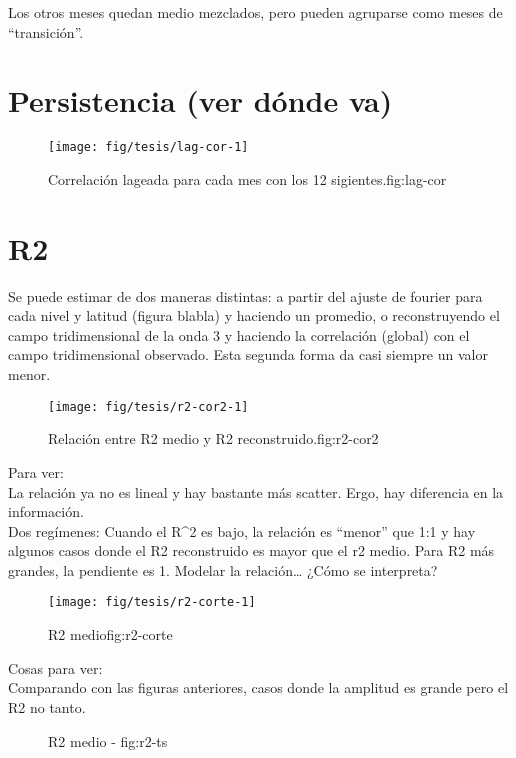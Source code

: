\documentclass[spanish,a4paper]{book}
\begin{document}
Los otros meses quedan medio mezclados, pero pueden agruparse como meses
de ``transición''.

\section{Persistencia (ver dónde va)}\label{persistencia-ver-donde-va}

\begin{figure}
\texttt{[image: fig/tesis/lag-cor-1]} \caption{Correlación lageada para cada mes con los 12 sigientes.{fig:lag-cor}}\label{fig:lag-cor}
\end{figure}

\section{R2}\label{r2}

Se puede estimar de dos maneras distintas: a partir del ajuste de
fourier para cada nivel y latitud (figura blabla) y haciendo un
promedio, o reconstruyendo el campo tridimensional de la onda 3 y
haciendo la correlación (global) con el campo tridimensional observado.
Esta segunda forma da casi siempre un valor menor.

\begin{figure}
\texttt{[image: fig/tesis/r2-cor2-1]} \caption{Relación entre R2 medio y R2 reconstruido.{fig:r2-cor2}}\label{fig:r2-cor2}
\end{figure}

Para ver:\\
La relación ya no es lineal y hay bastante más scatter. Ergo, hay
diferencia en la información.\\
Dos regímenes: Cuando el R\^{}2 es bajo, la relación es ``menor'' que
1:1 y hay algunos casos donde el R2 reconstruido es mayor que el r2
medio. Para R2 más grandes, la pendiente es 1. Modelar la
relación\ldots{} ¿Cómo se interpreta?

\begin{figure*}
\texttt{[image: fig/tesis/r2-corte-1]} \caption{R2 medio{fig:r2-corte}}\label{fig:r2-corte}
\end{figure*}

Cosas para ver:\\
Comparando con las figuras anteriores, casos donde la amplitud es grande
pero el R2 no tanto.

\begin{figure*}
\newline{}\caption{R2 medio - fig:r2-ts}\label{fig:r2-ts}
\end{figure*}
\end{document}
